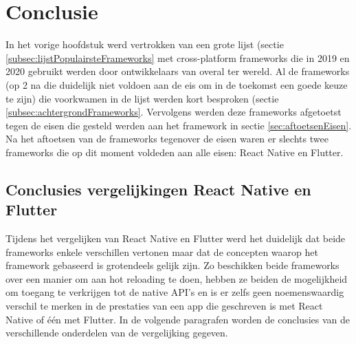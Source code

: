 
\chapter{Conclusie}
\label{ch:conclusie}



In het vorige hoofdstuk werd vertrokken van een grote lijst (sectie \ref{subsec:lijstPopulairsteFrameworks} met cross-platform frameworks die in 2019 en 2020 gebruikt werden door ontwikkelaars van overal ter wereld. Al de frameworks (op 2 na die duidelijk niet voldoen aan de eis om in de toekomst een goede keuze te zijn) die voorkwamen in de lijst werden kort besproken (sectie \ref{subsec:achtergrondFrameworks}. Vervolgens werden deze frameworks afgetoetst tegen de eisen die gesteld werden aan het framework in sectie \ref{sec:aftoetsenEisen}. Na het aftoetsen van de frameworks tegenover de eisen waren er slechts twee frameworks die op dit moment voldeden aan alle eisen: React Native en Flutter.

\section{Conclusies vergelijkingen React Native en Flutter}
\label{sec:conclusieVgl}

Tijdens het vergelijken van React Native en Flutter werd het duidelijk dat beide frameworks enkele verschillen vertonen maar dat de concepten waarop het framework gebaseerd is grotendeels gelijk zijn. Zo beschikken beide frameworks over een manier om aan hot reloading te doen, hebben ze beiden de mogelijkheid om toegang te verkrijgen tot de native API's en is er zelfs geen noemenswaardig verschil te merken in de prestaties van een app die geschreven is met React Native of één met Flutter. In de volgende paragrafen worden de conclusies van de verschillende onderdelen van de vergelijking gegeven.

